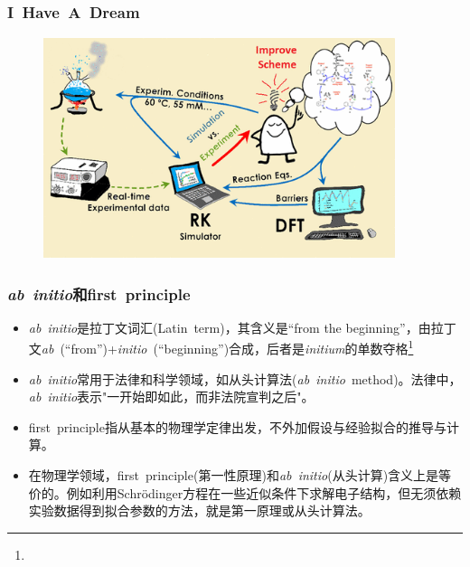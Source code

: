 \frame
{
	\frametitle{\rm{I~Have~A~Dream}}
\begin{figure}[h!]
\vspace*{-0.18in}
\centering
\includegraphics[height=2.55in,width=4.05in]{Figures/Schematic_Material-Design.png}
\label{Schematic_Material-Design}
\end{figure}
}

\frame
{
	\frametitle{\textit{ab~initio}和\textrm{first~principle}}
	\begin{itemize}
		\item \textit{ab~initio}是拉丁文词汇\textrm{(Latin~term)}，其含义是\textrm{``from the beginning''}，由拉丁文\textit{ab}~\textrm{(``from'')}+\textit{initio}~\textrm{(``beginning'')}合成，后者是\textit{initium}的单数夺格\footnote{\fontsize{5.5pt}{4.2pt}}
		\item \textit{ab~initio}常用于法律和科学领域，如从头计算法(\textit{ab~initio}~\textrm{method})。法律中，\textit{ab~initio}表示"一开始即如此，而非法院宣判之后"。
		\item \textrm{first~principle}指从基本的物理学定律出发，不外加假设与经验拟合的推导与计算。
		\item 在物理学领域，\textrm{first~principle}(第一性原理)和\textit{ab~initio}(从头计算)含义上是等价的。例如利用\textrm{Schr\"odinger}方程在一些近似条件下求解电子结构，但无须依赖实验数据得到拟合参数的方法，就是第一原理或从头计算法。
	\end{itemize}
}

